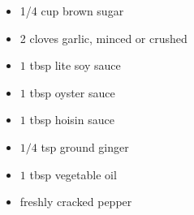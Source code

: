 \documentclass{article}
\begin{document}
\begin{minipage}{\textwidth}
\begin{multicols*}{2}
\columnbreak
\begin{minipage}{\linewidth}
\ingredients[Glaze]
\vspace{-1em}
\begin{itemize}
    \item 1/4 cup brown sugar
    \item 2 cloves garlic, minced or crushed
    \item $1$ tbsp lite soy sauce
    \item $1$ tbsp oyster sauce
    \item $1$ tbsp hoisin sauce
    \item $1/4$ tsp ground ginger
    \item $1$ tbsp vegetable oil
    \item freshly cracked pepper
\end{itemize}
\end{minipage}
\end{multicols*}
\end{minipage}
\vspace{1em}
\end{document}
